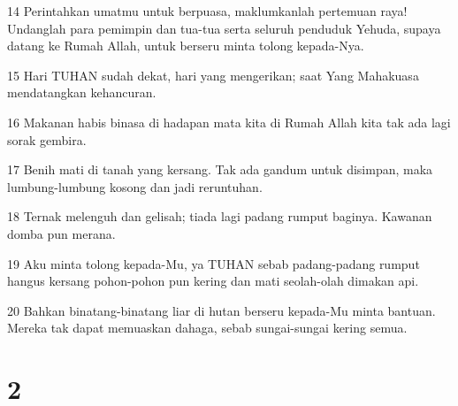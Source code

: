 \par 14 Perintahkan umatmu untuk berpuasa, maklumkanlah pertemuan raya! Undanglah para pemimpin dan tua-tua serta seluruh penduduk Yehuda, supaya datang ke Rumah Allah, untuk berseru minta tolong kepada-Nya.
\par 15 Hari TUHAN sudah dekat, hari yang mengerikan; saat Yang Mahakuasa mendatangkan kehancuran.
\par 16 Makanan habis binasa di hadapan mata kita di Rumah Allah kita tak ada lagi sorak gembira.
\par 17 Benih mati di tanah yang kersang. Tak ada gandum untuk disimpan, maka lumbung-lumbung kosong dan jadi reruntuhan.
\par 18 Ternak melenguh dan gelisah; tiada lagi padang rumput baginya. Kawanan domba pun merana.
\par 19 Aku minta tolong kepada-Mu, ya TUHAN sebab padang-padang rumput hangus kersang pohon-pohon pun kering dan mati seolah-olah dimakan api.
\par 20 Bahkan binatang-binatang liar di hutan berseru kepada-Mu minta bantuan. Mereka tak dapat memuaskan dahaga, sebab sungai-sungai kering semua.

\chapter{2}

